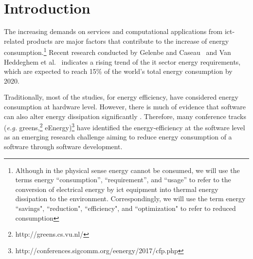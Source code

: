 \section{Introduction}
The increasing demands on services and computational applications 
from {\sc ict}-related products are major factors that contribute
to the increase of energy consumption.{\footnote{Although in the physical sense energy 
		cannot be consumed, we will use the terms energy ``consumption'', 
		``requirement'', and ``usage'' to refer to the conversion of 
		electrical energy by {\sc ict} equipment into thermal energy 
		dissipation to the environment. 
		Correspondingly, we will use the term energy ``savings", 
		``reduction", ``efficiency", and ``optimization" to refer 
		to reduced consumption}} 
Recent research conducted by Gelenbe and Caseau~ and 
Van Heddeghem et al.~ indicates a 
rising trend of the {\sc it} sector energy requirements, which are 
expected to reach 15\% of the world's total energy consumption 
by 2020. 


Traditionally, most of the studies, for energy efficiency, 
have considered energy consumption at hardware level. 
However, there is much of evidence that software can also 
alter energy dissipation significantly \cite{eder_energy_consumptions, 
capra_is_2012, ferreira_seflab_2013}. 
Therefore, many conference tracks (\textit{e.g.} {\sc greens},\footnote{http://greens.cs.vu.nl/} 
eEnergy)\footnote{http://conferences.sigcomm.org/eenergy/2017/cfp.php} have identified the energy-efficiency 
at the software level as an emerging research challenge aiming 
to reduce energy consumption of a software through software development.




